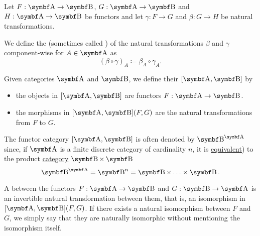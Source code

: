 \begin{definition}\label{def:natural_transformation_composition}
  Let \( F: \Cat{A} \to \Cat{B} \), \( G: \Cat{A} \to \Cat{B} \) and \( H: \Cat{A} \to \Cat{B} \) be functors and let \( \gamma: F \to G \) and \( \beta: G \to H \) be natural transformations.

  We define the  (sometimes called ) of the natural transformations \( \beta \) and \( \gamma \) component-wise for \( A \in \Cat{A} \) as
  \begin{equation*}
    (\beta \circ \gamma)_A \coloneqq \beta_{A} \circ \gamma_A.
  \end{equation*}
\end{definition}

\begin{definition}\label{def:functor_category}
  Given categories \( \Cat{A} \) and \( \Cat{B} \), we define their  \( [\Cat{A}, \Cat{B}] \) by
  \begin{itemize}
    \item the objects in \( [\Cat{A}, \Cat{B}] \) are functors \( F: \Cat{A} \to \Cat{B} \).
    \item the morphisms in \( [\Cat{A}, \Cat{B}](F, G) \) are the natural transformations from \( F \) to \( G \).
  \end{itemize}

  The functor category \( [\Cat{A}, \Cat{B}] \) is often denoted by \( {\Cat{B}}^{\Cat{A}} \) since, if \( \Cat{A} \) is a finite discrete category of cardinality \( n \), it is \hyperref[def:category_equivalence]{equivalent}) to the product \hyperref[def:product_category]{category} \( \Cat{B} \times \Cat{B} \)
  \begin{equation*}
    {\Cat{B}}^{\Cat{A}} = {\Cat{B}}^n = \Cat{B} \times \ldots \times \Cat{B}.
  \end{equation*}
\end{definition}

\begin{definition}\label{def:natural_isomorpism}
  A  between the functors \( F: \Cat{A} \to \Cat{B} \) and \( G: \Cat{B} \to \Cat{A} \) is an invertible natural transformation between them, that is, an isomorphism in \( [\Cat{A}, \Cat{B}](F, G) \). If there exists a natural isomorphism between \( F \) and \( G \), we simply say that they are naturally isomorphic without mentioning the isomorphism itself.
\end{definition}

